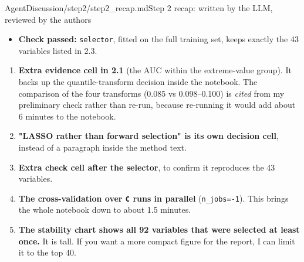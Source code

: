 \begin{mdfile}{AgentDiscussion/\allowbreak{}step2/\allowbreak{}step2\_recap.md}{Step 2 recap: written by the LLM, reviewed by the authors}
\begin{itemize}
  \begin{itemize}
  \tightlist
  \item
    Only 15 of the 43 selected variables appear in at least 80\% of resamples. The median frequency is 0.69 and the lowest is 0.25.
  \item
    \texttt{Research\ and\ development\ expense\ rate} is not selected on the full training set, yet appears in 81\% of resamples.
  \item
    The LASSO keeps both members of a practically identical pair (\texttt{Current\ Liabilities/Liability} and \texttt{Current\ Liability\ to\ Liability}), each with a tiny coefficient.
  \item
    The variable list is a predictive shortlist, not a set of causes.
  \end{itemize}
\item
  \textbf{Check passed:} \texttt{selector}, fitted on the full training set, keeps exactly the 43 variables listed in 2.3.
\end{itemize}


\begin{enumerate}
\def\labelenumi{\arabic{enumi}.}
\tightlist
\item
  \textbf{Extra evidence cell in 2.1} (the AUC within the extreme-value group). It backs up the quantile-transform decision inside the notebook. The comparison of the four transforms (0.085 vs 0.098--0.100) is \emph{cited} from my preliminary check rather than re-run, because re-running it would add about 6 minutes to the notebook.
\item
  \textbf{"LASSO rather than forward selection" is its own decision cell}, instead of a paragraph inside the method text.
\item
  \textbf{Extra check cell after the selector}, to confirm it reproduces the 43 variables.
\item
  \textbf{The cross-validation over \texttt{C} runs in parallel} (\texttt{n\_jobs=-1}). This brings the whole notebook down to about 1.5 minutes.
\item
  \textbf{The stability chart shows all 92 variables that were selected at least once.} It is tall. If you want a more compact figure for the report, I can limit it to the top 40.
\end{enumerate}



\end{mdfile}
